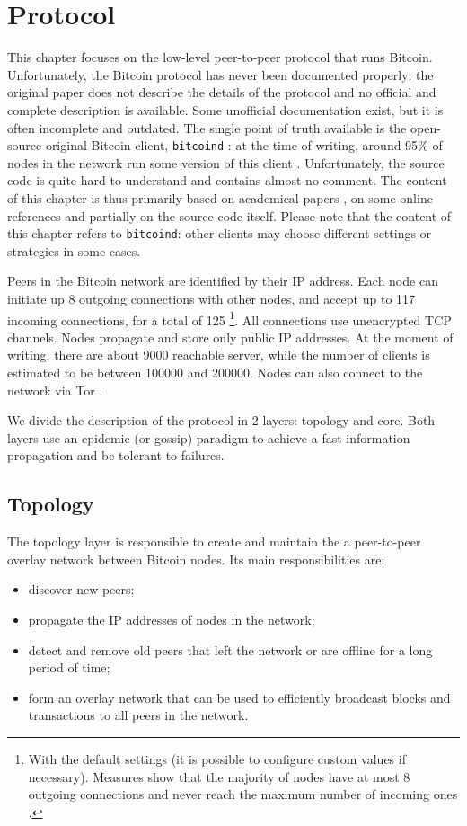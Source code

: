 \chapter{Protocol}
\label{chapter:protocol}
This chapter focuses on the low-level peer-to-peer protocol that runs Bitcoin.
Unfortunately, the Bitcoin protocol has never been documented properly:
the original paper \cite{bitcoin_2009} does not describe the details of the protocol and no official and complete description is available.
Some unofficial documentation exist, but it is often incomplete and outdated.
The single point of truth available is the open-source original Bitcoin client, \texttt{bitcoind} \cite{bitcoin_github}:
at the time of writing, around \num{95}\% of nodes in the network run some version of this client \cite{bitnodes}.
Unfortunately, the source code is quite hard to understand and contains almost no comment.
The content of this chapter is thus primarily based on academical papers \cite{eclipse_attack_2015, deanonymization_2014}, on some online references \cite{bitcoin_reference, bitcoin_guide} and partially on the source code itself.
Please note that the content of this chapter refers to \texttt{bitcoind}:
other clients may choose different settings or strategies in some cases.

\bigskip
Peers in the Bitcoin network are identified by their IP address.
Each node can initiate up \num{8} outgoing connections with other nodes, and accept up to \num{117} incoming connections, for a total of \num{125} \footnote{With the default settings (it is possible to configure custom values if necessary). Measures show that the majority of nodes have at most \num{8} outgoing connections and never reach the maximum number of incoming ones \cite{discovering_influential_nodes_2014}.}.
All connections use unencrypted TCP channels.
Nodes propagate and store only public IP addresses.
At the moment of writing, there are about \num{9000} reachable server, while the number of clients is estimated to be between \num{100000} and \num{200000}.
Nodes can also connect to the network via Tor \cite{bicoin_tor}.

\bigskip
We divide the description of the protocol in \num{2} layers: topology and core.
Both layers use an epidemic (or gossip) paradigm \cite{gossip_1987} to achieve a fast information propagation and be tolerant to failures.


\section{Topology}
The topology layer is responsible to create and maintain the a peer-to-peer overlay network between Bitcoin nodes.
Its main responsibilities are:
\begin{itemize}
	\item discover new peers;
	\item propagate the IP addresses of nodes in the network;
	\item detect and remove old peers that left the network or are offline for a long period of time;
	\item form an overlay network that can be used to efficiently broadcast blocks and transactions to all peers in the network.
\end{itemize}

